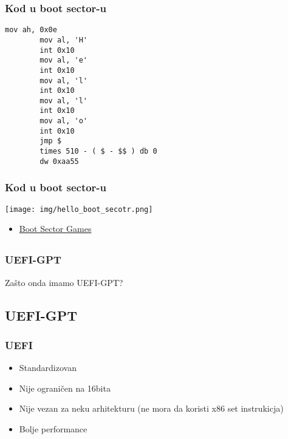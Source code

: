 \documentclass{beamer}
\begin{document}
\begin{frame}[fragile]
    \frametitle{Kod u boot sector-u}
    \begin{lstlisting}[language={[x86masm]Assembler}]
        mov ah, 0x0e
        mov al, 'H'
        int 0x10
        mov al, 'e'
        int 0x10
        mov al, 'l'
        int 0x10
        mov al, 'l'
        int 0x10
        mov al, 'o'
        int 0x10
        jmp $ 
        times 510 - ( $ - $$ ) db 0
        dw 0xaa55

    \end{lstlisting}
\end{frame}

\begin{frame}
    \frametitle{Kod u boot sector-u}
    \begin{center}
        \texttt{[image: img/hello\_boot\_secotr.png]}
    \end{center}
    \begin{itemize}
        \item \href{https://youtu.be/1UzTf0Qo37A}{Boot Sector Games}
    \end{itemize}
\end{frame}

\subsection*{}

\begin{frame}
    \frametitle{UEFI-GPT}
    \begin{center}
        Zašto onda imamo UEFI-GPT?
    \end{center}
\end{frame}

\subsection*{UEFI-GPT}
\begin{frame}
    \frametitle{UEFI}
    \begin{itemize}
        \item Standardizovan \newline
        \item Nije ograničen na 16bita \newline
        \item Nije vezan za neku arhitekturu (ne mora da koristi x86 set instrukicja)\newline
        \item Bolje performance 
    \end{itemize}
\end{frame}
\end{document}
